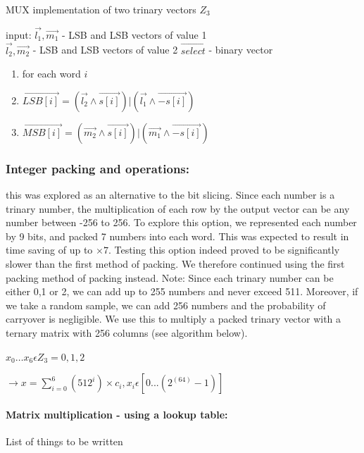 \begin{algorithm}
		\caption{MUX implementation of two trinary vectors $Z_3$}
			\label{alg:algpack4} 

	
		input:   $\vec{l_1}, \vec{m_1}$ - LSB and LSB vectors of value 1  \\
					$\vec{l_2}, \vec{m_2}$ - LSB and LSB vectors of value 2
					$\vec{select}$ - binary vector

	\begin{enumerate}
		\item for each word $i$
	    \item $\vec{LSB[i]} =( \vec{l_2} \land \vec{s[i]}) | (\vec{l_1} \land \vec{- s[i]})$
	    		    \item $\vec{MSB[i]} =( \vec{m_2} \land \vec{s[i]}) | (\vec{m_1} \land \vec{- s[i]})$
		
	\end{enumerate}
	
\end{algorithm}

\fi%

\subsubsection{Integer packing and operations:} this was explored as an alternative to the bit slicing.  Since each number is a trinary number, the multiplication of each row by the output vector can be any number between -256 to 256. To explore this option, we represented each number by 9 bits, and packed 7 numbers into each word. This was expected to result in time saving of up to $\times 7$. Testing this option indeed proved to be significantly slower than the first method of packing. We therefore continued using the first packing method of packing instead.
Note: Since each trinary number can be either 0,1 or 2, we can add up to 255 numbers and never exceed 511. Moreover, if we take a random sample, we can add 256 numbers and the probability of carryover is negligible. We use this to multiply a packed trinary vector with a ternary matrix with 256 columns (see algorithm below).
	
	$x_0 \dots x_6 \epsilon Z_3 = {0,1,2}$
	
	$ \rightarrow x = \sum_{i=0}^{6} (512^i) \times c_i, x_i \epsilon [0 ... (2^(64)-1)]$



\paragraph{Matrix multiplication - using a lookup table: }
List of things to be written\\

